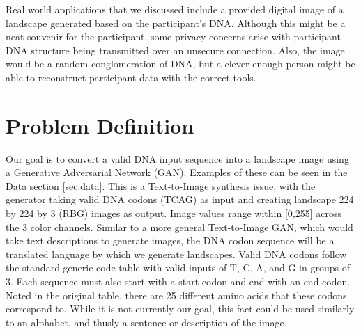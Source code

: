 \documentclass{article}
\begin{document}
	Real world applications that we discussed include a provided digital image of a landscape generated based on the participant’s DNA. Although this might be a neat souvenir for the participant, some privacy concerns arise with participant DNA structure being transmitted over an unsecure connection. Also, the image would be a random conglomeration of DNA, but a clever enough person might be able to reconstruct participant data with the correct tools. 


	\section{Problem Definition}
	\label{sec:problemdef}
	Our goal is to convert a valid DNA input sequence into a landscape image using a Generative Adversarial Network (GAN). Examples of these can be seen in the Data section \ref{sec:data}. This is a Text-to-Image synthesis issue, with the generator taking valid DNA codons (TCAG) as input and creating landscape 224 by 224 by 3 (RBG) images as output. Image values range within [0,255] across the 3 color channels. Similar to a more general Text-to-Image GAN, which would take text descriptions to generate images, the DNA codon sequence will be a translated language by which we generate landscapes. Valid DNA codons follow the standard generic code table with valid inputs of T, C, A, and G in groups of 3. Each sequence must also start with a start codon and end with an end codon. Noted in the original table, there are 25 different amino acids that these codons correspond to. While it is not currently our goal, this fact could be used similarly to an alphabet, and thusly a sentence or description of the image.  
\end{document}
